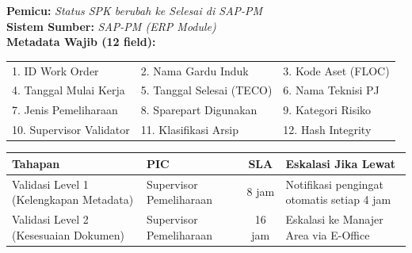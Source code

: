 \documentclass[12pt,a4paper]{report}
\begin{document}
\begin{tcolorbox}[colback=fillgreen, colframe=plnblue!50, sharp corners, title={\small\bfseries Komponen 4: Pemicu Sistem \& Metadata Wajib}]
\small
\noindent\textbf{Pemicu:} \textit{Status SPK berubah ke Selesai di SAP-PM}\\[0.2cm]
\textbf{Sistem Sumber:} \textit{SAP-PM (ERP Module)}\\[0.2cm]
\textbf{Metadata Wajib (12 field):}\\[0.2cm]
\begin{tabularx}{\textwidth}{@{} X X X @{}}
1. ID Work Order & 2. Nama Gardu Induk & 3. Kode Aset (FLOC) \\[0.2cm]
4. Tanggal Mulai Kerja & 5. Tanggal Selesai (TECO) & 6. Nama Teknisi PJ \\[0.2cm]
7. Jenis Pemeliharaan & 8. Sparepart Digunakan & 9. Kategori Risiko \\[0.2cm]
10. Supervisor Validator & 11. Klasifikasi Arsip & 12. Hash Integrity \\
\end{tabularx}
\end{tcolorbox}

\begin{tcolorbox}[colback=fillgreen, colframe=plnblue!50, sharp corners, title={\small\bfseries Komponen 5: Alur Validasi \& SLA}]
\small
\renewcommand{\arraystretch}{1.5}
\begin{tabularx}{\textwidth}{@{} >{\raggedright\arraybackslash}X >{\raggedright\arraybackslash}X c >{\raggedright\arraybackslash}X @{}}
\toprule
\textbf{Tahapan} & \textbf{PIC} & \textbf{SLA} & \textbf{Eskalasi Jika Lewat} \\
\midrule
Validasi Level 1 (Kelengkapan Metadata) & Supervisor Pemeliharaan & 8 jam & Notifikasi pengingat otomatis setiap 4 jam \\
\hline
Validasi Level 2 (Kesesuaian Dokumen) & Supervisor Pemeliharaan & 16 jam & Eskalasi ke Manajer Area via E-Office \\
\bottomrule
\end{tabularx}
\end{tcolorbox}
\end{document}
